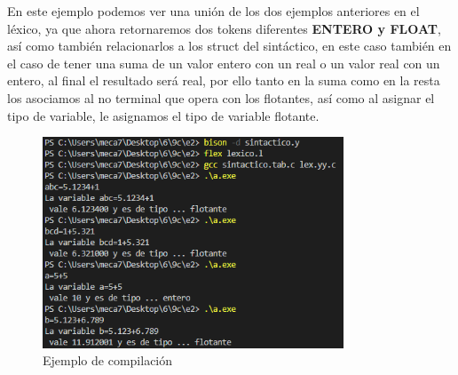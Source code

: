 \documentclass[12pt]{article}
\begin{document}
En este ejemplo podemos ver una unión de los dos ejemplos anteriores en el léxico, ya que ahora retornaremos dos tokens diferentes \textbf{ENTERO y FLOAT}, así como también relacionarlos a los struct del sintáctico, en este caso también en el caso de tener una suma de un valor entero con un real o un valor real con un entero, al final el resultado será real, por ello tanto en la suma como en la resta los asociamos al no terminal que opera con los flotantes, así como al asignar el tipo de variable, le asignamos el tipo de variable flotante.

\begin{figure}[h]
    \centering
    \includegraphics[width=0.8\textwidth]{images/Capture03A.PNG}
    \caption{Ejemplo de compilación}
\end{figure}
\end{document}
